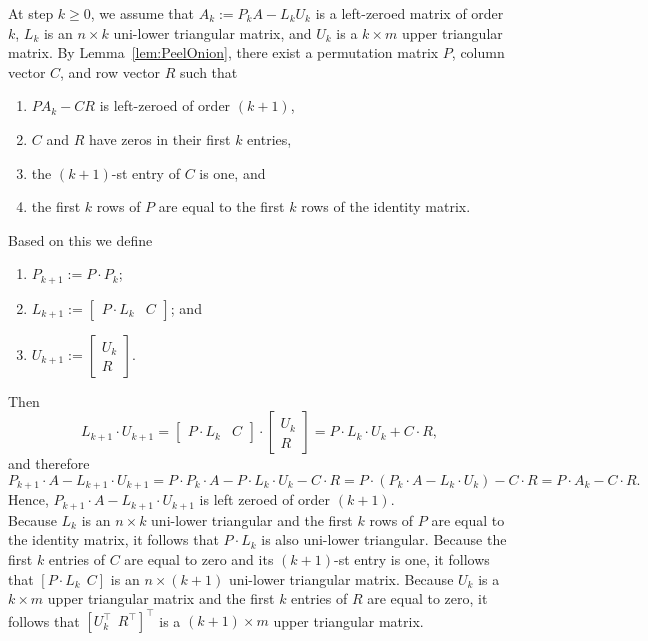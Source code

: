 At step $k\ge0$, we assume that $A_k:= P_kA - L_k U_k$ is a left-zeroed matrix of order $k$, $L_k$ is an $n \times k$ uni-lower triangular matrix, and $U_k$ is a $k \times m$ upper triangular matrix. By Lemma~\ref{lem:PeelOnion}, there exist a permutation matrix $P$, column vector $C$, and row vector $R$ such that 
\begin{enumerate}
\setlength{\itemsep}{.2cm}
\renewcommand{\labelenumi}{(\alph{enumi})}
\item $PA_k - C R $ is left-zeroed of order $(k+1)$, 
\item $C$ and $R$ have zeros in their first $k$ entries, 
\item the $(k+1)$-st entry of $C$ is one, and
\item the first $k$ rows of $P$ are equal to the first $k$ rows of the identity matrix.
\end{enumerate}
Based on this we define 
\begin{enumerate}
\renewcommand{\labelenumi}{(\roman{enumi})}
\setlength{\itemsep}{.2cm}
\item $P_{k+1}:=P\cdot P_k$;
\item $L_{k+1}:=\left[ \begin{array}{rl} P \cdot L_k & C\end{array} \right]$; and
\item $U_{k+1}:=\left[ \begin{array}{l} U_k \\ R\end{array} \right]$.
\end{enumerate}
Then 
$$L_{k+1} \cdot U_{k+1} = \left[ \begin{array}{ll} P \cdot L_k & C\end{array} \right] \cdot \left[ \begin{array}{l} U_k \\ R\end{array} \right] = P \cdot L_k \cdot U_k + C \cdot R,$$
and therefore 
 $$P_{k+1} \cdot A - L_{k+1} \cdot U_{k+1} = P \cdot P_k\cdot  A -P \cdot L_k \cdot U_k - C \cdot R =  P \cdot \left(P_k \cdot A -L_k \cdot U_k \right) - C \cdot R = P \cdot A_k - C \cdot R.$$
Hence, $P_{k+1} \cdot A - L_{k+1} \cdot U_{k+1}$ is left zeroed of order $(k+1)$.\\

Because $L_k$ is an $n \times k$ uni-lower triangular and the first $k$ rows of $P$ are equal to the identity matrix, it follows that $P \cdot L_k$ is also uni-lower triangular. Because the first $k$ entries of $C$ are equal to zero and its $(k+1)$-st entry is one, it follows that $[P \cdot L_k ~~ C]$ is an $n \times (k+1)$ uni-lower triangular matrix. Because $U_k$ is a $k \times m$ upper triangular matrix and the first $k$ entries of $R$ are equal to zero, it follows that $[U_k^\top ~~ R^\top]^\top$ is a $(k+1)  \times m$ upper triangular matrix.\\

